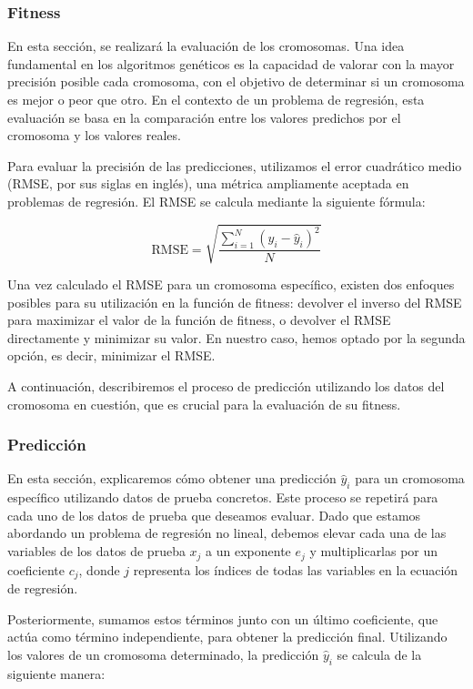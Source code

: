 \documentclass[conference,a4paper]{IEEEtran}
\begin{document}
\subsubsection{Fitness}
En esta sección, se realizará la evaluación de los cromosomas. Una idea fundamental en los algoritmos genéticos es la capacidad de valorar con la mayor precisión posible cada cromosoma, con el objetivo de determinar si un cromosoma es mejor o peor que otro. En el contexto de un problema de regresión, esta evaluación se basa en la comparación entre los valores predichos por el cromosoma y los valores reales.

Para evaluar la precisión de las predicciones, utilizamos el error cuadrático medio (RMSE, por sus siglas en inglés), una métrica ampliamente aceptada en problemas de regresión. El RMSE se calcula mediante la siguiente fórmula:

\[
\text{RMSE} = \sqrt{\frac{\sum_{i=1}^{N} (y_i - \hat{y}_i)^2}{N}}
\]


Una vez calculado el RMSE para un cromosoma específico, existen dos enfoques posibles para su utilización en la función de fitness: devolver el inverso del RMSE para maximizar el valor de la función de fitness, o devolver el RMSE directamente y minimizar su valor. En nuestro caso, hemos optado por la segunda opción, es decir, minimizar el RMSE.

A continuación, describiremos el proceso de predicción utilizando los datos del cromosoma en cuestión, que es crucial para la evaluación de su fitness.

\subsubsection{Predicción}
En esta sección, explicaremos cómo obtener una predicción \(\hat{y}_i\) para un cromosoma específico utilizando datos de prueba concretos. Este proceso se repetirá para cada uno de los datos de prueba que deseamos evaluar. Dado que estamos abordando un problema de regresión no lineal, debemos elevar cada una de las variables de los datos de prueba \(x_j\) a un exponente \(e_j\) y multiplicarlas por un coeficiente \(c_j\), donde \(j\) representa los índices de todas las variables en la ecuación de regresión. 

Posteriormente, sumamos estos términos junto con un último coeficiente, que actúa como término independiente, para obtener la predicción final. Utilizando los valores de un cromosoma determinado, la predicción \(\hat{y}_i\) se calcula de la siguiente manera:
\end{document}
